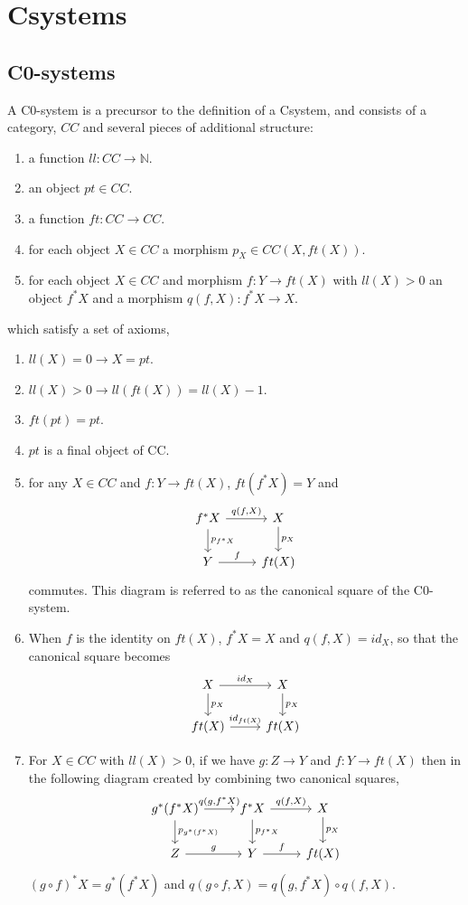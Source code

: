 \section{Csystems}
\subsection{C0-systems}
A C0-system is a precursor to the definition of a Csystem, and consists of a
category, $CC$ and several pieces of additional structure:
\begin{enumerate}
    \item a function $ll: CC\to \mathbb{N}$.
    \item an object $pt\in CC$.
    \item a function $ft: CC\to CC$.
    \item for each object $X\in CC$ a morphism $p_X\in CC(X, ft(X))$.
    \item for each object $X\in CC$ and morphism $f: Y\to ft(X)$ with $ll(X) >
    0$ an object $f^*X$ and a morphism $q(f, X) : f^*X\to X$.
\end{enumerate}
which satisfy a set of axioms,
\begin{enumerate}
    \item $ll(X) = 0 \longrightarrow X=pt$.
    \item $ll(X) > 0 \longrightarrow ll(ft(X)) = ll(X) - 1$.
    \item $ft(pt) = pt$.
    \item $pt$ is a final object of CC.
    \item for any $X\in CC$ and $f: Y\to ft(X)$, $ft(f^*X)=Y$ and
    \[
    \begin{tikzcd}
        f^*X\ar[r,"{q(f,X)}"]\ar[d,"p_{f^*X}"]&X\ar[d,"p_X"] \\
        Y\ar[r,"f"]&ft(X)
    \end{tikzcd}
    \]
    commutes. This diagram is referred to as the canonical square of the
    C0-system.
    \item When $f$ is the identity on $ft(X)$, $f^*X = X$ and $q(f, X) = id_X$,
    so that the canonical square becomes
    \[
    \begin{tikzcd}
        X\ar[r,"id_X"]\ar[d,"p_X"]&X\ar[d,"p_X"] \\
        ft(X)\ar[r,"id_{ft(X)}"]&ft(X)
    \end{tikzcd}
    \]
    \item For $X\in CC$ with $ll(X)>0$, if we have $g:Z\to Y$ and $f:Y\to ft(X)$
    then in the following diagram created by combining two canonical squares,
    \[
    \begin{tikzcd}
        g^*(f^*X)\ar[r,"{q(g, f^*X)}"]\ar[d,"p_{g^*(f^*X)}"]&
        f^*X\ar[r,"{q(f,X)}"]\ar[d,"p_{f^*X}"]&
        X\ar[d,"p_X"] \\
        Z\ar[r,"g"]&
        Y\ar[r,"f"]&
        ft(X)
    \end{tikzcd}
    \]
    $(g\circ f)^*X = g^*(f^*X)$ and $q(g\circ f, X) = q(g, f^*X)\circ q(f, X)$.
\end{enumerate}

